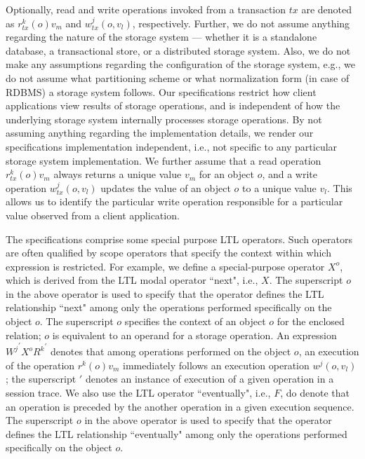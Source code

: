 \documentclass{sig-alternate-05-2015}
\begin{document}
    Optionally, read and write operations invoked from a transaction $tx$ are denoted as $r^k_{tx}(o){v_m}$ and $w^j_{tx}(o,v_l)$, respectively. %
  Further, we do not assume anything regarding the nature of the storage system --- whether it is a standalone database, a transactional store, or a distributed storage system. Also, we do not make any assumptions regarding the configuration of the storage system, e.g., we do not assume what partitioning scheme or what normalization form (in case of RDBMS) a storage system follows. Our specifications restrict how client applications view results of storage operations, and is independent of how the underlying storage system internally processes storage operations. By not assuming anything regarding the implementation details, we render our specifications implementation independent, i.e., not specific to any particular storage system implementation. We further assume that a read operation $r^k_{tx}(o){v_m}$ always returns a unique value $v_m$ for an object $o$, and a write operation $w^j_{tx}(o,v_l)$ updates the value of an object $o$ to a unique value $v_l$.  This allows us to identify the particular write operation responsible for a particular value observed from a client application.
 \par  The specifications comprise some special purpose LTL operators. Such operators are often qualified by scope operators
   that specify the context within which expression is
  restricted. For example, we define a special-purpose operator  $X^{o}$, which is derived
  from the  LTL modal operator ``next", i.e., $X$. The superscript ${o}$ in the above operator is used to specify that the
   operator defines the LTL relationship ``next" among only the operations performed specifically on the object ${o}$. The
    superscript $o$ specifies the context of an object $o$ for the enclosed relation; $o$ is equivalent to an operand for a
     storage operation. An expression ${W^j}^{'} X^{o} {R^k}^{'}$ denotes that among operations performed on the object
     ${o}$, an execution of the operation $r^k(o){v_m}$ immediately follows an execution operation $w^j(o,v_l)$; the
      superscript $'$ denotes an instance of execution of a given operation in a session trace. We also use the  LTL
      operator ``eventually", i.e., $F$, do denote that an operation is preceded by the another operation in a given
      execution sequence. The superscript ${o}$ in the above operator is used to specify that the operator defines the  LTL relationship ``eventually" among only the operations performed specifically on the object ${o}$.
\end{document}
